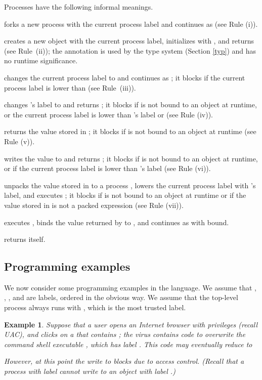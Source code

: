 \documentclass{sigplanconf}
\newenvironment{compact}
        {\begin{list}{}{
}}
        {\end{list}}
\newtheorem{example}[definition]{Example}
\begin{document}
Processes have the following informal meanings. 
\begin{compact}
\item  forks a new process  with the current process label and continues as  (see Rule (i)).
\item  creates a new object  with the current process label,  initializes  with , and returns  (see Rule~(ii)); the annotation  is used by the type system (Section \ref{typ}) and has no runtime significance. 
\item  changes the current process label to  and
  continues as
  ; it blocks if the current process label is lower than  (see Rule~(iii)).
\item  changes 's label to  and returns ; it
  blocks if   is not bound to an object at runtime, or the current process label is lower than 's label or  (see Rule (iv)).
\item  returns the value stored in ; it blocks if
   is not bound to an object at runtime (see Rule (v)).
\item  writes the value  to  and returns ; it blocks if
   is not bound to an object at runtime, or if the current process label is lower than 's label (see Rule (vi)).
\item  unpacks the value stored in  to a
  process , lowers the current process label with 's label, and executes
  ; it blocks if  is not bound to an object
 at runtime or if the value stored in  is not a packed expression (see Rule (vii)).
\item  executes , binds the value returned by  to , and
  continues as
   with  bound.
\item  returns itself.
\end{compact}


\subsection{Programming examples}


We now consider some programming examples in the language. We assume that , , , and  are labels, ordered in the obvious way. We assume that the top-level process always runs with , which is the most trusted label. 

\begin{example}\label{eg:1} \rm Suppose that a  user opens an Internet browser  with 
privileges (recall UAC), and clicks on a  that contains ; the virus contains code to overwrite
the command shell executable , which has label . 
This code may eventually reduce to 

However, at this point the write to  blocks due to
access control. (Recall that a process with label  cannot write to an
object with label .)
\end{example}
\end{document}
